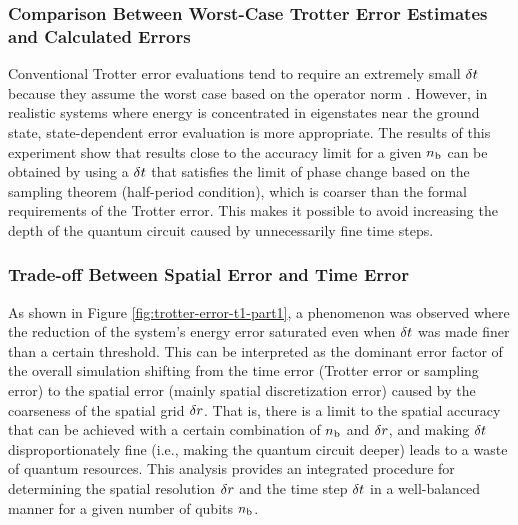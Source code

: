 \documentclass[wabun2025.tex]{subfiles}
\begin{document}
\subsubsection{Comparison Between Worst-Case Trotter Error Estimates and Calculated Errors}
Conventional Trotter error evaluations tend to require an extremely small
$\delta t$ because they assume the worst case based on the operator norm
\cite{Burgarth2024.PhysRevResearch.6.043155}. However, in realistic systems
where energy is concentrated in eigenstates near the ground state,
state-dependent error evaluation is more appropriate. The results of this
experiment show that results close to the accuracy limit for a given $n_{\mathrm{b}}$ can
be obtained by using a $\delta t$ that satisfies the limit of phase change based
on the sampling theorem (half-period condition), which is coarser than the
formal requirements of the Trotter error. This makes it possible to avoid
increasing the depth of the quantum circuit caused by unnecessarily fine time
steps.

\subsubsection{Trade-off Between Spatial Error and Time Error}
As shown in Figure \ref{fig:trotter-error-t1-part1}, a phenomenon was observed
where the reduction of the system's energy error saturated even when $\delta t$
was made finer than a certain threshold. This can be interpreted as the dominant
error factor of the overall simulation shifting from the time error (Trotter
error or sampling error) to the spatial error (mainly spatial discretization
error) caused by the coarseness of the spatial grid $\delta r$. That is, there is
a limit to the spatial accuracy that can be achieved with a certain combination
of $n_{\mathrm{b}}$ and $\delta r$, and making $\delta t$ disproportionately fine (i.e.,
making the quantum circuit deeper) leads to a waste of quantum resources. This
analysis provides an integrated procedure for determining the spatial resolution
$\delta r$ and the time step $\delta t$ in a well-balanced manner for a given
number of qubits $n_{\mathrm{b}}$.
\end{document}

